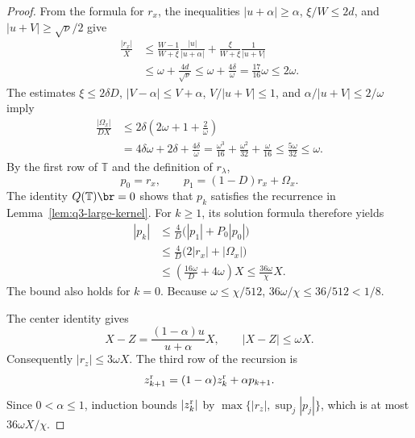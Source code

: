 \begin{proof}
From the formula for \(r_x\), the inequalities
\(|u+\alpha|\ge\alpha\),
\(\xi/W\le2d\), and
\(|u+V|\ge\sqrt{\nu}/2\) give
\[
\begin{aligned}
\frac{|r_x|}{X}
&\le\frac{W-1}{W+\xi}\frac{|u|}{|u+\alpha|}
   +\frac{\xi}{W+\xi}\frac{1}{|u+V|}\\
&\le\omega+\frac{4d}{\sqrt{\nu}}
\le\omega+\frac{4\delta}{\omega}
=\frac{17}{16}\omega\le2\omega.
\end{aligned}
\]
The estimates \(\xi\le2\delta D\),
\(|V-\alpha|\le V+\alpha\),
\(V/|u+V|\le1\), and
\(\alpha/|u+V|\le2/\omega\) imply
\[
\begin{aligned}
\frac{|\Omega_x|}{DX}
&\le2\delta\left(2\omega+1+\frac{2}{\omega}\right)\\
&=4\delta\omega+2\delta+\frac{4\delta}{\omega}
=\frac{\omega^3}{16}+\frac{\omega^2}{32}+\frac{\omega}{16}
\le\frac{5\omega}{32}\le\omega.
\end{aligned}
\]
By the first row of \(\mathbb{T}\) and the definition of
\(r_\lambda\),
\[
p_0=r_x,
\qquad p_1=(1-D)r_x+\Omega_x.
\]
The identity \(Q(\mathbb{T})\br=0\) shows that \(p_k\)
satisfies the recurrence in Lemma~\ref{lem:q3-large-kernel}.
For \(k\ge1\), its solution formula therefore yields
\[
\begin{aligned}
|p_k|
&\le\frac4D\bigl(|p_1|+P_0|p_0|\bigr)\\
&\le\frac4D\bigl(2|r_x|+|\Omega_x|\bigr)\\
&\le\left(\frac{16\omega}{D}+4\omega\right)X
\le\frac{36\omega}{\chi}X.
\end{aligned}
\]
The bound also holds for \(k=0\).
Because \(\omega\le\chi/512\),
\(36\omega/\chi\le36/512<1/8\).

The center identity gives
\[
X-Z=\frac{(1-\alpha)u}{u+\alpha}X,
\qquad |X-Z|\le\omega X.
\]
Consequently \(|r_z|\le3\omega X\).
The third row of the recursion is
\[
z_{k+1}^{\rm r}=(1-\alpha)z_k^{\rm r}+\alpha p_{k+1}.
\]
Since \(0<\alpha\le1\), induction bounds \(|z_k^{\rm r}|\)
by \(\max\{|r_z|,\sup_j|p_j|\}\), which is at most
\(36\omega X/\chi\).


\end{proof}
